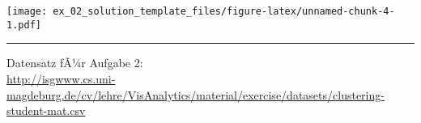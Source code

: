 \documentclass[11pt,]{article}
\begin{document}
\texttt{[image: ex\_02\_solution\_template\_files/figure-latex/unnamed-chunk-4-1.pdf]}

\begin{center}\rule{0.5\linewidth}{\linethickness}\end{center}

Datensatz fÃ¼r Aufgabe 2:\\
\url{http://isgwww.cs.uni-magdeburg.de/cv/lehre/VisAnalytics/material/exercise/datasets/clustering-student-mat.csv}
\end{document}
